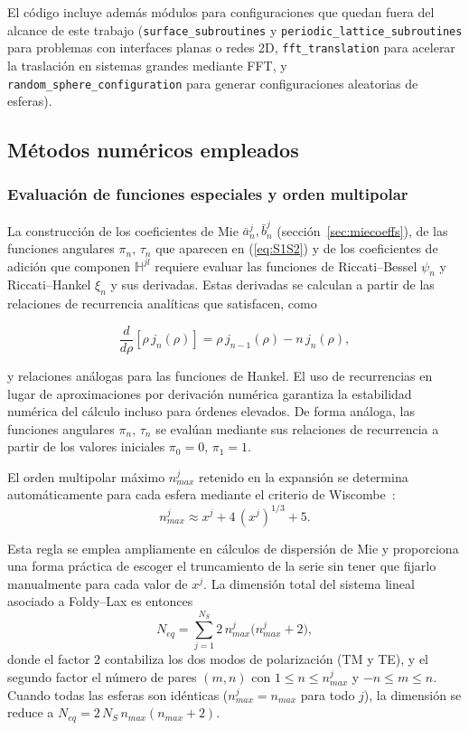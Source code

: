 El código incluye además módulos para configuraciones que quedan fuera
del alcance de este trabajo (\texttt{surface\_subroutines} y
\texttt{periodic\_lattice\_subroutines} para problemas con interfaces
planas o redes 2D, \texttt{fft\_translation} para acelerar la traslación
en sistemas grandes mediante FFT, y \texttt{random\_sphere\_configuration}
para generar configuraciones aleatorias de esferas).


\subsection{Métodos numéricos empleados}
\label{sec:metodos}
\subsubsection{Evaluación de funciones especiales y orden multipolar}
\label{sec:funcesp}

La construcción de los coeficientes de Mie $\bar a_n^j,\bar b_n^j$
(sección~\ref{sec:miecoeffs}), de las funciones angulares
$\pi_n,\,\tau_n$ que aparecen en (\ref{eq:S1S2}) y de los coeficientes
de adición que componen $\mathbb{H}^{jl}$ requiere evaluar las funciones
de Riccati--Bessel $\psi_n$ y Riccati--Hankel $\xi_n$ y sus derivadas.
Estas derivadas se calculan a partir de las relaciones de recurrencia
analíticas que satisfacen, como

\begin{equation}
  \frac{d}{d\rho}\left[\rho\,j_n(\rho)\right]
  = \rho\,j_{n-1}(\rho) - n\,j_n(\rho),
\end{equation}

y relaciones análogas para las funciones de Hankel. El uso de
recurrencias en lugar de aproximaciones por derivación numérica
garantiza la estabilidad numérica del cálculo incluso para órdenes
elevados. De forma análoga, las funciones angulares $\pi_n,\,\tau_n$
se evalúan mediante sus relaciones de recurrencia a partir de los
valores iniciales $\pi_0 = 0$, $\pi_1 = 1$.

El orden multipolar máximo $n_{max}^{j}$ retenido en la expansión se
determina automáticamente para cada esfera mediante el criterio de
Wiscombe~\cite{Wiscombe1980}:
\begin{equation}
\label{eq:wiscombe}
  n_{max}^{j} \approx x^{j} + 4\,(x^{j})^{1/3} + 5.
\end{equation}

Esta regla se emplea ampliamente en cálculos de dispersión de Mie y
proporciona una forma práctica de escoger el truncamiento de la serie sin
tener que fijarlo manualmente para cada valor de $x^{j}$.
La dimensión total del sistema lineal
asociado a Foldy--Lax es entonces
\begin{equation}
\label{eq:Neq}
  N_{eq} = \sum_{j=1}^{N_S} 2\,n_{max}^{j}\bigl(n_{max}^{j}+2\bigr),
\end{equation}
donde el factor $2$ contabiliza los dos modos de polarización (TM y TE),
y el segundo factor el número de pares $(m,n)$ con $1 \le n \le n_{max}^{j}$
y $-n \le m \le n$. Cuando todas las esferas son idénticas
($n_{max}^{j} = n_{max}$ para todo $j$), la dimensión se reduce a
$N_{eq} = 2\,N_S\,n_{max}(n_{max}+2)$.


